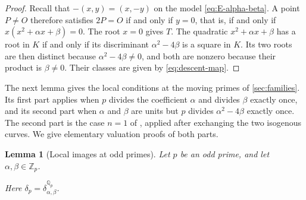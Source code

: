 \documentclass[12pt,oneside,openany]{book}
\theoremstyle{definition}
\theoremstyle{plain}
\numberwithin{equation}{chapter}
\theoremstyle{plain}
\newtheorem{lemma}[lemma]{Lemma}
\theoremstyle{definition}
\theoremstyle{remark}
\newcommand{\Q}{\mathbb Q}
\newcommand{\Z}{\mathbb Z}
\newcommand{\sq}[1]{[#1]}
\begin{document}
\begin{proof}
Recall that $-(x,y)=(x,-y)$ on the model \eqref{eq:E-alpha-beta}. A point $P\ne O$ therefore satisfies $2P=O$ if and only if $y=0$, that is, if and only if $x(x^2+\alpha x+\beta)=0$. The root $x=0$ gives $T$. The quadratic $x^2+\alpha x+\beta$ has a root in $K$ if and only if its discriminant $\alpha^2-4\beta$ is a square in $K$. Its two roots are then distinct because $\alpha^2-4\beta\ne0$, and both are nonzero because their product is $\beta\ne0$. Their classes are given by \eqref{eq:descent-map}.
\end{proof}

The next lemma gives the local conditions at the moving primes of \cref{sec:families}. Its first part applies when $p$ divides the coefficient $\alpha$ and divides $\beta$ exactly once, and its second part when $\alpha$ and $\beta$ are units but $p$ divides $\alpha^2-4\beta$ exactly once. The second part is the case $n=1$ of \cite[Lemma~3.3(i)]{Zywina2026}, applied after exchanging the two isogenous curves. We give elementary valuation proofs of both parts.

\begin{lemma}[Local images at odd primes]\label{lem:odd-local}
Let $p$ be an odd prime, and let $\alpha,\beta\in\Z_p$.
Here $\delta_p=\delta^{\Q_p}_{\alpha,\beta}$.
\end{lemma}
\end{document}
